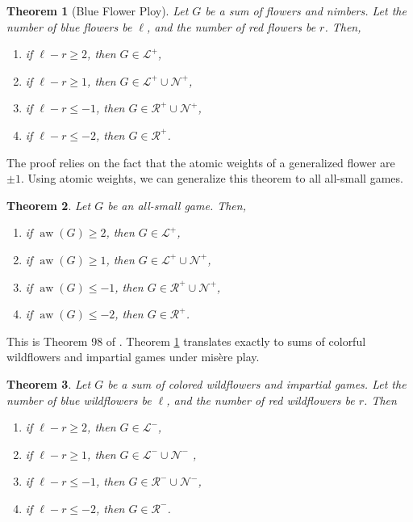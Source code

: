 \documentclass{amsart}
\theoremstyle{plain}
\newtheorem{thm}{Theorem}
\theoremstyle{definition}
\theoremstyle{remark}
\numberwithin{equation}{section}
\numberwithin{thm}{section}
\DeclareMathOperator{\aw}{aw}
\begin{document}
\begin{thm}[Blue Flower Ploy]
  \label{atomic_weight_og}
    Let $G $ be a sum of flowers and nimbers. Let the number of blue flowers be $\ell$, and the number of red flowers be $r$. Then,
\begin{enumerate}
    \item  if $\ell-r \geq 2$, then $G \in \mathcal{L}^+$,
    \item if $\ell-r \geq 1$, then $G \in \mathcal{L}^+ \cup\mathcal{N}^+$, 
    \item  if $\ell-r \leq -1$, then $G \in \mathcal{R}^+ \cup\mathcal{N}^+$, 
    \item if $\ell-r \leq-2$, then ${G}\in\mathcal{R}^+$.
\end{enumerate}
\end{thm}

The proof relies on the fact that the atomic weights of a generalized flower are $\pm 1$. Using atomic weights, we can generalize this theorem to all all-small games.
\begin{thm}
\label{2aheadPloy}
    Let $G$ be an all-small game. Then, 
    \begin{enumerate}
    \item  if $\aw(G)\geq 2$, then $G \in \mathcal{L}^+$,
    \item if $\aw(G) \geq 1$, then $G \in \mathcal{L}^+ \cup\mathcal{N}^+$, 
    \item  if $\aw(G)\leq -1$, then $G \in \mathcal{R}^+ \cup\mathcal{N}^+$, 
    \item if $\aw(G)\leq-2$, then ${G}\in\mathcal{R}^+$.
\end{enumerate}
\end{thm}

This is Theorem 98 of \cite{conway2000numbers}.
Theorem \ref{atomic_weight_og} translates exactly to sums of colorful wildflowers and impartial games under mis\`ere play.

\begin{thm}
  \label{atomic_weight}
    Let $G $ be a sum of colored wildflowers and impartial games. Let the number of blue wildflowers be $\ell$, and the number of red wildflowers be $r$. Then 
\begin{enumerate}
    \item  if $\ell-r \geq 2$, then $ G \in \mathcal{L}^-$,
    \item if $\ell-r \geq 1$, then $G \in \mathcal{L}^- \cup\mathcal{N}^-$ ,
    \item  if $\ell-r \leq -1$, then $G \in \mathcal{R}^- \cup\mathcal{N}^-$,
    \item if $\ell-r \leq -2$, then $ {G}\in\mathcal{R}^-$.
\end{enumerate}
\end{thm}
\end{document}
